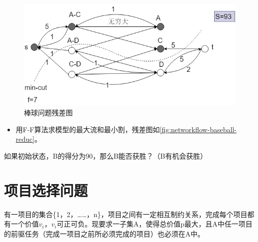 \begin{figure}[htb]
	\centering
	\includegraphics[scale=0.6]{image/networkflow7.png}
	\caption{棒球问题残差图}\label{fig:networkflow-baseball-reduc}
\end{figure}

\begin{itemize}
	\item 用F-F算法求模型的最大流和最小割，残差图如\autoref{fig:networkflow-baseball-reduc}。
\end{itemize}
\begin{example}
	如果初始状态，B的得分为90，那么B能否获胜？（B有机会获胜）
\end{example}

\section{项目选择问题}
\begin{example}
	有一项目的集合\{1，2，……，n\}，项目之间有一定相互制约关系，完成每个项目都有一个价值\(v_i\)，\(v_i\)可正可负。现要求一子集A，使得总价值p最大，且A中任一项目的前驱任务（完成一项目之前所必须完成的项目）也必须在A中。
\end{example}

